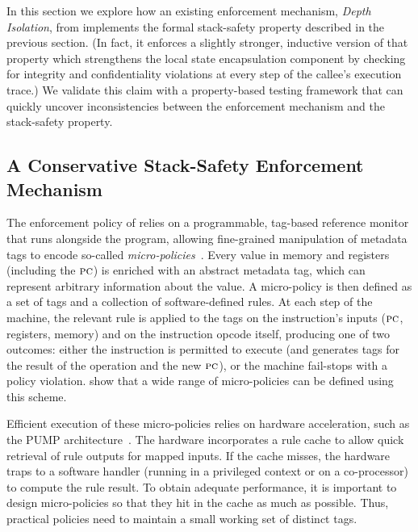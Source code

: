 \documentclass[acmsmall,review,anonymous]{acmart}\settopmatter{printfolios=true,printccs=false,printacmref=false}
\begin{document}

In this section we explore how an existing enforcement mechanism, {\em
  Depth Isolation}, from \citet{DBLP:conf/sp/RoesslerD18} implements
the formal stack-safety property described in the previous
section. (In fact, it enforces a slightly stronger, inductive version
of that property which strengthens the local state encapsulation
component by checking for integrity and confidentiality violations at
every step of the callee's execution trace.) We validate this claim
with a property-based testing framework that can quickly uncover
inconsistencies between the enforcement mechanism and the stack-safety
property.

\subsection{A Conservative Stack-Safety Enforcement Mechanism}
%
The enforcement policy of \citeauthor{DBLP:conf/sp/RoesslerD18} relies
on a programmable, tag-based reference monitor that runs alongside the
program,
allowing fine-grained manipulation of metadata tags to encode so-called
\emph{micro-policies}~\citep{pump_oakland2015}.
Every value in
memory and registers (including the $\textsc{pc}$)
is enriched with an abstract metadata tag, which can represent
arbitrary information about the value. A micro-policy is then defined as a
set of tags and a
collection of software-defined rules.
At each step of the machine, the relevant rule is applied to the tags on
the instruction's inputs ($\textsc{pc}$, registers, memory) and on the
instruction opcode itself, producing
one of two outcomes: either the instruction is permitted to execute (and
generates tags for the result of the operation and the new $\textsc{pc}$), or
the machine fail-stops with a policy violation.
\citeauthor{pump_oakland2015} show that a wide range of
micro-policies can be defined using this scheme.

Efficient execution of these micro-policies relies on hardware acceleration,
such as the PUMP architecture~\citep{pump:asplos2015}.
The hardware incorporates a rule cache
to allow quick retrieval of rule outputs for mapped inputs. If the cache misses,
the hardware traps to a software handler (running in a privileged context or
on a co-processor) to compute the rule result. To obtain adequate performance,
it is important to design micro-policies so that they hit in the cache as
much as possible. Thus, practical policies need to maintain a small working
set of distinct tags.
\end{document}
